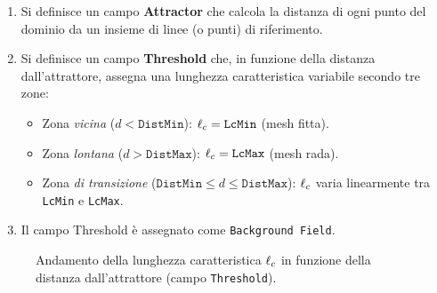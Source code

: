 \begin{enumerate}
  \item Si definisce un campo \textbf{Attractor} che calcola la distanza di ogni punto del
    dominio da un insieme di linee (o punti) di riferimento.
  \item Si definisce un campo \textbf{Threshold} che, in funzione della distanza dall'attrattore,
    assegna una lunghezza caratteristica variabile secondo tre zone:
    \begin{itemize}
      \item Zona \emph{vicina} ($d < \texttt{DistMin}$): $\ell_c = \texttt{LcMin}$ (mesh fitta).
      \item Zona \emph{lontana} ($d > \texttt{DistMax}$): $\ell_c = \texttt{LcMax}$ (mesh rada).
      \item Zona \emph{di transizione} ($\texttt{DistMin} \le d \le \texttt{DistMax}$):
        $\ell_c$ varia linearmente tra \texttt{LcMin} e \texttt{LcMax}.
    \end{itemize}
  \item Il campo Threshold è assegnato come \texttt{Background Field}.
\end{enumerate}

\begin{figure}[H]
  \centering
  \caption{Andamento della lunghezza caratteristica $\ell_c$ in funzione della distanza
           dall'attrattore (campo \texttt{Threshold}).}
  \label{fig:threshold}
\end{figure}

